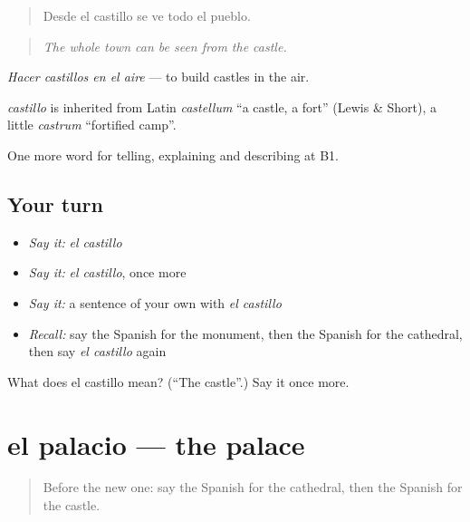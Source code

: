 \begin{quote}
Desde el castillo se ve todo el pueblo.
\end{quote}

\begin{quote}
\emph{The whole town can be seen from the castle.}
\end{quote}

\emph{Hacer castillos en el aire} — to build castles in the air.

\begin{cousinweb}
\emph{castillo} is inherited from Latin \emph{castellum} \textquotedblleft{}a castle, a fort\textquotedblright{} (Lewis \& Short), a little \emph{castrum} \textquotedblleft{}fortified camp\textquotedblright{}.
\end{cousinweb}

\begin{grammarlens}[title={What you've built}]
One more word for telling, explaining and describing at B1.
\end{grammarlens}

\subsection*{Your turn}
\begin{itemize}
\raggedright
  \item \emph{Say it:} \emph{el castillo}
  \item \emph{Say it:} \emph{el castillo}, once more
  \item \emph{Say it:} a sentence of your own with \emph{el castillo}
  \item \emph{Recall:} say the Spanish for the monument, then the Spanish for the cathedral, then say \emph{el castillo} again
\end{itemize}

\begin{tcolorbox}[breakable,colback=teal!4,colframe=teal!35!black,title={Before you move on}]
What does el castillo mean? (\textquotedblleft{}The castle\textquotedblright{}.) Say it once more.
\end{tcolorbox}
\section[el palacio]{el palacio — the palace}

\label{lesson:ES-C677-palacio}



\begin{quote}
Before the new one: say the Spanish for the cathedral, then the Spanish for the castle.
\end{quote}

